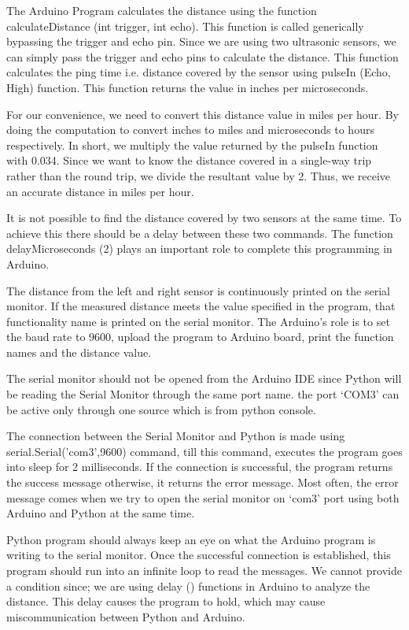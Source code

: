 \documentclass[12pt,journal]{IEEEtran}
\begin{document}
\bigskip
\par The Arduino Program calculates the distance using the function calculateDistance (int trigger, int echo). This function is called generically bypassing the trigger and echo pin. Since we are using two ultrasonic sensors, we can simply pass the trigger and echo pins to calculate the distance. This function calculates the ping time i.e. distance covered by the sensor using pulseIn (Echo, High) function. This function returns the value in inches per microseconds.
\newpage
\bigskip
\par For our convenience, we need to convert this distance value in miles per hour. By doing the computation to convert inches to miles and microseconds to hours respectively. In short, we multiply the value returned by the pulseIn function with 0.034. Since we want to know the distance covered in a single-way trip rather than the round trip, we divide the resultant value by 2. Thus, we receive an accurate distance in miles per hour.
\par It is not possible to find the distance covered by two sensors at the same time. To achieve this there should be a delay between these two commands. The function delayMicroseconds (2) plays an important role to complete this programming in Arduino.
\par The distance from the left and right sensor is continuously printed on the serial monitor. If the measured distance meets the value specified in the program, that functionality name is printed on the serial monitor. The Arduino’s role is to set the baud rate to 9600, upload the program to Arduino board, print the function names and the distance value.
\par The serial monitor should not be opened from the Arduino IDE since Python will be reading the Serial Monitor through the same port name. the port ‘COM3’ can be active only through one source which is from python console.
\par The connection between the Serial Monitor and Python is made using serial.Serial('com3',9600) command, till this command, executes the program goes into sleep for 2 milliseconds. If the connection is successful, the program returns the success message otherwise, it returns the error message. Most often, the error message comes when we try to open the serial monitor on ‘com3’ port using both Arduino and Python at the same time. 
\par Python program should always keep an eye on what the Arduino program is writing to the serial monitor. Once the successful connection is established, this program should run into an infinite loop to read the messages. We cannot provide a condition since; we are using delay () functions in Arduino to analyze the distance. This delay causes the program to hold, which may cause miscommunication between Python and Arduino.
\end{document}
